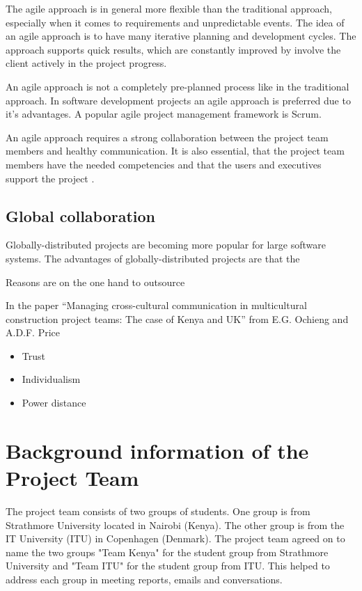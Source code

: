 The agile approach is in general more flexible than the traditional approach, especially when it comes to requirements and unpredictable events. The idea of an agile approach is to have many iterative planning and development cycles. The approach supports quick results, which are constantly improved by involve the client actively in the project progress.

An agile approach is not a completely pre-planned process like in the traditional approach. In software development projects an agile approach is preferred due to it's advantages. A popular agile project management framework is Scrum.

An agile approach requires a strong collaboration between the project team members and healthy communication. It is also essential, that the project team members have the needed competencies and that the users and executives support the project .

\subsection{Global collaboration} 
Globally-distributed projects are becoming more popular for large software systems. The advantages of globally-distributed projects are that the

Reasons are on the one hand to outsource 

In the paper “Managing cross-cultural communication in multicultural construction project teams: The case of Kenya and UK”  from E.G. Ochieng and A.D.F. Price

	\begin{itemize}
		\item Trust
		\item Individualism
		\item Power distance
	\end{itemize}


\section{Background information of the Project Team}
The project team consists of two groups of students. One group is from Strathmore University located in Nairobi (Kenya). The other group is from the IT University (ITU) in Copenhagen (Denmark). The project team agreed on to name the two groups "Team Kenya" for the student group from Strathmore University and "Team ITU" for the student group from ITU. This helped to address each group in meeting reports, emails and conversations.

